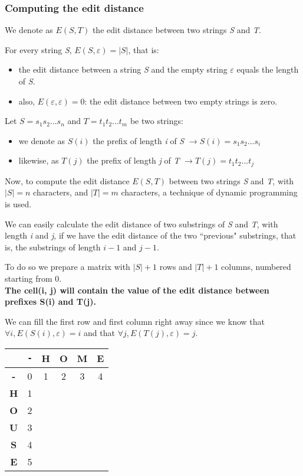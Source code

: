\documentclass[../main.tex]{subfiles}
\begin{document}
\subsubsection{Computing the edit distance}

We denote as $E(S, T)$ the edit distance between two strings \emph{S} and \emph{T}.

For every string \emph{S}, $E(S, \varepsilon) = |S|$, that is:
\begin{itemize}
\item the edit distance between a string \emph{S} and the empty string $\varepsilon$ equals the length of \emph{S}.
\item also, $E(\varepsilon, \varepsilon)=0$: the edit distance between two empty strings is zero.
\end{itemize}

Let $S = s_1s_2...s_n$ and $T = t_1t_2...t_m$ be two strings:
\begin{itemize}
\item we denote as $S(i)$ the prefix of length \emph{i} of \emph{S} $\rightarrow S(i) = s_1s_2...s_i$
\item likewise, as $T(j)$ the prefix of length \emph{j} of \emph{T} $\rightarrow T(j) = t_1t_2...t_j$
\end{itemize}
\newpage

Now, to compute the edit distance $E(S, T)$ between two strings \emph{S} and \emph{T}, with $|S| = n$ characters, and $|T|=m$ characters, a technique of dynamic programming is used. 

We can easily calculate the edit distance of two substrings of \emph{S} and \emph{T}, with length \emph{i} and \emph{j}, if we have the edit distance of the two ``previous" substrings, that is, the substrings of length $i-1$ and $j-1$.

To do so we prepare a matrix with $|S| + 1$ rows and $|T| + 1$ columns, numbered starting from 0.\\

\textbf{The cell(i, j) will contain the value of the edit distance between prefixes S(i) and T(j).}

We can fill the first row and first column right away since we know that $\forall i, E(S(i), \varepsilon) = i$ and that $\forall j, E(T(j), \varepsilon) = j$.

\begin{center}
\begin{tabular}{|c|c|c|c|c|c|}
\hline
& \texttt{-} & \textbf{H} & \textbf{O} & \textbf{M} & \textbf{E} \\
\hline
\textbf{-} & 0 & 1 & 2 & 3 & 4 \\
\hline
\textbf{H} & 1 & & & & \\
\hline
\textbf{O} & 2 & & & & \\
\hline
\textbf{U} & 3 & & & & \\
\hline
\textbf{S} & 4 & & & & \\
\hline
\textbf{E} & 5 & & & & \\
\hline
\end{tabular}
\end{center}
\end{document}
